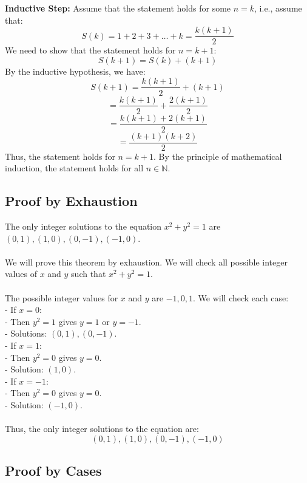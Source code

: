 	\textbf{Inductive Step:} Assume that the statement holds for some \( n = k \), i.e., assume that:
	\[
		S(k) = 1 + 2 + 3 + \ldots + k = \frac{k(k+1)}{2}
	\]
	We need to show that the statement holds for \( n = k + 1 \):
	\[
		S(k+1) = S(k) + (k + 1)
	\]
	By the inductive hypothesis, we have:
	\[
		S(k+1) = \frac{k(k+1)}{2} + (k + 1)
	\]
	\[
		= \frac{k(k+1)}{2} + \frac{2(k + 1)}{2}
	\]
	\[      = \frac{k(k+1) + 2(k + 1)}{2}
	\]
	\[
		= \frac{(k + 1)(k + 2)}{2}
	\]
	Thus, the statement holds for \( n = k + 1 \).
	By the principle of mathematical induction, the statement holds for all \( n \in \mathbb{N} \).

\QED

\subsection{Proof by Exhaustion}

The only integer solutions to the equation \( x^2 + y^2 = 1 \) are \( (0, 1), (1, 0), (0, -1), (-1, 0) \).
\\\\
	We will prove this theorem by exhaustion. We will check all possible integer values of \( x \) and \( y \) such that \( x^2 + y^2 = 1 \).
\\\\
	The possible integer values for \( x \) and \( y \) are \( -1, 0, 1 \). We will check each case:
	\\
	- If \( x = 0 \):
	\\
	- Then \( y^2 = 1 \) gives \( y = 1 \) or \( y = -1 \).
	\\
	- Solutions: \( (0, 1), (0, -1) \).
	\\
	- If \( x = 1 \):
	\\
	- Then \( y^2 = 0 \) gives \( y = 0 \).
	\\
	- Solution: \( (1, 0) \).
	\\
	- If \( x = -1 \):
	\\
	- Then \( y^2 = 0 \) gives \( y = 0 \).
	\\
	- Solution: \( (-1, 0) \).
\\\\
	Thus, the only integer solutions to the equation are:
	\[
		(0, 1), (1, 0), (0, -1), (-1, 0)
	\]

\QED

\subsection{Proof by Cases}

